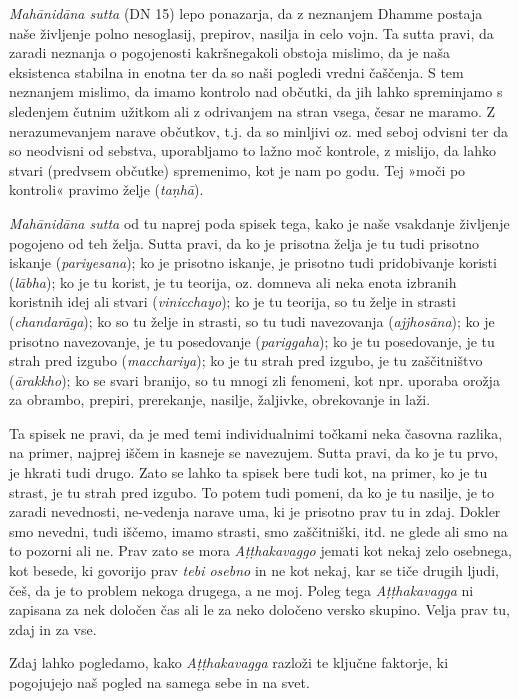 \emph{Mahānidāna sutta} (DN 15) lepo ponazarja, da z neznanjem Dhamme
postaja naše življenje polno nesoglasij, prepirov, nasilja in celo vojn.
Ta sutta pravi, da zaradi neznanja o pogojenosti kakršnegakoli obstoja
mislimo, da je naša eksistenca stabilna in enotna ter da so naši pogledi
vredni čaščenja. S tem neznanjem mislimo, da imamo kontrolo nad občutki,
da jih lahko spreminjamo s sledenjem čutnim užitkom ali z odrivanjem na
stran vsega, česar ne maramo. Z nerazumevanjem narave občutkov, t.j. da
so minljivi oz. med seboj odvisni ter da so neodvisni od sebstva,
uporabljamo to lažno moč kontrole, z mislijo, da lahko stvari (predvsem
občutke) spremenimo, kot je nam po godu. Tej »moči po kontroli« pravimo
želje (\emph{taṇhā}).

\emph{Mahānidāna sutta} od tu naprej poda spisek tega, kako je naše
vsakdanje življenje pogojeno od teh želja. Sutta pravi, da ko je
prisotna želja je tu tudi prisotno iskanje (\emph{pariyesana}); ko je
prisotno iskanje, je prisotno tudi pridobivanje koristi (\emph{lābha});
ko je tu korist, je tu teorija, oz. domneva ali neka enota izbranih
koristnih idej ali stvari (\emph{vinicchayo}); ko je tu teorija, so tu
želje in strasti (\emph{chandarāga}); ko so tu želje in strasti, so tu
tudi navezovanja (\emph{ajjhosāna}); ko je prisotno navezovanje, je tu
posedovanje (\emph{pariggaha}); ko je tu posedovanje, je tu strah pred
izgubo (\emph{macchariya}); ko je tu strah pred izgubo, je tu
zaščitništvo (\emph{ārakkho}); ko se svari branijo, so tu mnogi zli
fenomeni, kot npr. uporaba orožja za obrambo, prepiri, prerekanje,
nasilje, žaljivke, obrekovanje in laži.

Ta spisek ne pravi, da je med temi individualnimi točkami neka časovna
razlika, na primer, najprej iščem in kasneje se navezujem. Sutta pravi,
da ko je tu prvo, je hkrati tudi drugo. Zato se lahko ta spisek bere
tudi kot, na primer, ko je tu strast, je tu strah pred izgubo. To potem
tudi pomeni, da ko je tu nasilje, je to zaradi nevednosti, ne-vedenja
narave uma, ki je prisotno prav tu in zdaj. Dokler smo nevedni, tudi
iščemo, imamo strasti, smo zaščitniški, itd. ne glede ali smo na to
pozorni ali ne. Prav zato se mora \emph{Aṭṭhakavaggo} jemati kot nekaj
zelo osebnega, kot besede, ki govorijo prav \emph{tebi osebno} in ne kot
nekaj, kar se tiče drugih ljudi, češ, da je to problem nekoga drugega, a
ne moj. Poleg tega \emph{Aṭṭhakavagga} ni zapisana za nek določen čas
ali le za neko določeno versko skupino. Velja prav tu, zdaj in za vse.

Zdaj lahko pogledamo, kako \emph{Aṭṭhakavagga} razloži te ključne
faktorje, ki pogojujejo naš pogled na samega sebe in na svet. 

